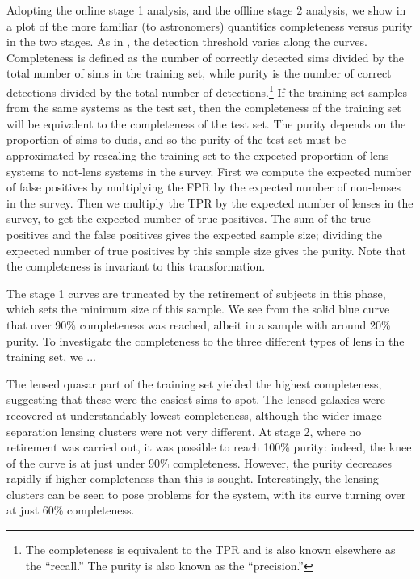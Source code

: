 \documentclass[useAMS,usenatbib,a4paper]{mn2e}
\begin{document}

Adopting the online stage 1 analysis, and the offline stage 2 analysis, we
show in  a plot of the more familiar (to
astronomers) quantities completeness versus purity in
the two stages. As in , the detection threshold
varies along the curves. Completeness is defined as the number of correctly
detected sims divided by the total number of sims in the training set, while
purity is the number of correct detections divided by the total number of
detections.\footnote{The completeness is equivalent to the TPR and is also
known elsewhere as the ``recall.''  The purity is also known as the
``precision.''} If the training set samples from the same systems as the test
set, then the completeness of the training set will be equivalent to the
completeness of the test set. The purity depends on the proportion of sims to
duds, and so the purity of the test set must be approximated by rescaling the
training set to the expected proportion of lens systems to not-lens systems in
the survey. First we compute the expected number of false positives by
multiplying the FPR by the expected number of non-lenses in the survey. Then
we multiply the TPR by the expected number of lenses in the survey, to get the
expected number of true positives. The sum of the true positives and the false
positives gives the expected sample size; dividing the expected number of true
positives by this sample size gives the purity. Note that the completeness is
invariant to this transformation.

The stage 1 curves are truncated by the retirement of subjects in this phase, 
which sets the minimum size of this sample. We see from the solid blue curve
that over 90\% completeness was reached, albeit in a sample with around 20\%
purity. To investigate the completeness to the three different types of lens
in the training set, we ... 


The lensed quasar part of the training set yielded the highest
completeness, suggesting that these were the easiest sims to spot. The lensed
galaxies were recovered at understandably lowest completeness, although the
wider image separation  lensing clusters were not very different. At stage 2,
where no retirement was carried out, it was possible to reach 100\% purity:
indeed, the knee of the curve is at just under 90\% completeness. However, the
purity decreases rapidly if higher completeness than this is sought.
Interestingly, the lensing clusters can be seen to pose problems for the
system, with its curve turning over at just 60\% completeness.
\end{document}
